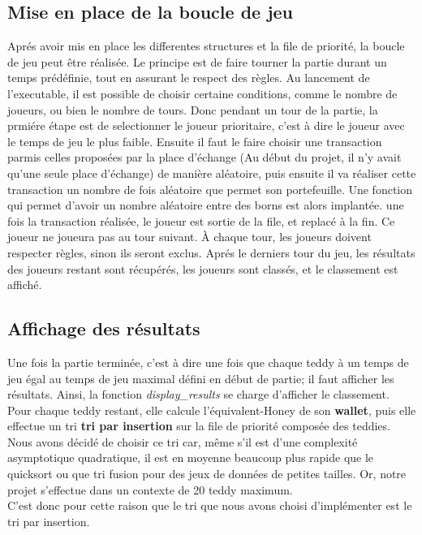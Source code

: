 \documentclass{article}
\begin{document}
\subsection{Mise en place de la boucle de jeu}

Apr\'es avoir mis en place les differentes structures et la file de priorité, la boucle de jeu peut \^etre r\'ealis\'ee.
Le principe est de faire tourner la partie durant un temps pr\'ed\'efinie, tout en assurant le respect des r\`egles.
Au lancement de l'executable, il est possible de choisir certaine conditions, comme le nombre de joueurs, ou bien le nombre de tours. 
Donc pendant un tour de la partie, la prmi\'ere \'etape est de selectionner le joueur prioritaire, c'est \`a dire le joueur avec le temps de jeu le plus
faible. 
Ensuite il faut le faire choisir une transaction parmis celles propos\'ees par la place d'\'echange (Au d\'ebut du projet, il n'y avait qu'une seule place
d'\'echange) de mani\`ere al\'eatoire, puis ensuite il va r\'ealiser cette transaction un nombre de fois al\'eatoire que permet son portefeuille.
Une fonction qui permet d'avoir un nombre al\'eatoire entre des borns est alors implant\'ee. 
une fois la transaction r\'ealis\'ee, le joueur est sortie de la file, et replac\'e \`a la fin. Ce joueur ne joueura pas au tour suivant. 
\`A chaque tour, les joueurs doivent respecter r\`egles, sinon ils seront exclus.
Apr\'es le derniers tour du jeu, les r\'esultats des joueurs restant sont r\'ecup\'er\'es, les joueurs sont class\'es, et le classement est affich\'e. 


\subsection{Affichage des r\'esultats}

Une fois la partie termin\'ee, c'est à dire une fois que chaque teddy à un temps de jeu \'egal au temps de jeu maximal d\'efini en d\'ebut de partie; il faut afficher les r\'esultats.
Ainsi, la fonction 
\textit{display_results} 
se charge d'afficher le classement.
Pour chaque teddy restant, elle calcule l'\'equivalent-Honey de son 
\textbf{wallet},
puis elle effectue un tri 
\textbf{tri par insertion} 
sur la file de priorité compos\'ee des teddies.
Nous avons d\'ecid\'e de choisir ce tri car, m\^eme s'il est d'une complexit\'e asymptotique quadratique, il est en moyenne beaucoup plus rapide que le quicksort ou que tri fusion pour des jeux de données de petites tailles.
Or, notre projet s'effectue dans un contexte de 20 teddy maximum. \\
C'est donc pour cette raison que le tri que nous avons choisi d'impl\'ementer est le tri par insertion.
\end{document}
